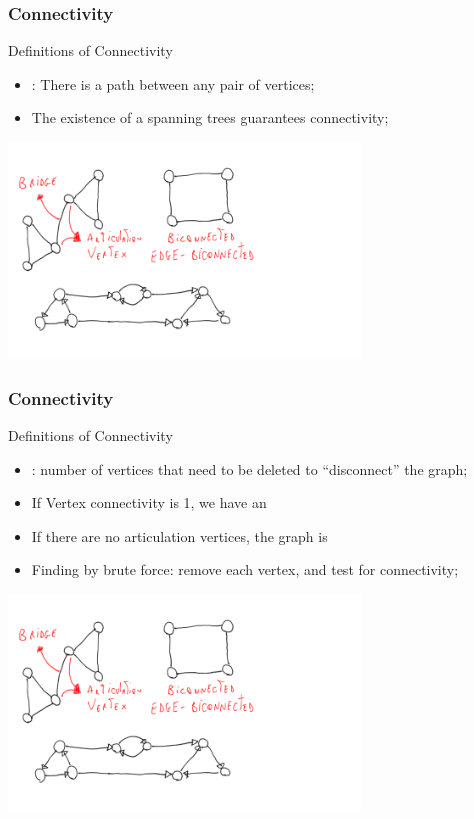\documentclass{beamer}
\begin{document}
\begin{frame}
  \frametitle{Connectivity}
  \begin{block}{Definitions of Connectivity}
    {\smaller
    \begin{itemize}
    \item {}: There is a path between any pair of vertices;
    \item The existence of a spanning trees guarantees connectivity;
    \end{itemize}
    }
  \end{block}
  
  \begin{center}
    \includegraphics[width=0.7\textwidth]{img/biconnected}
  \end{center}
\end{frame}

\begin{frame}
  \frametitle{Connectivity}
  \begin{block}{Definitions of Connectivity}
    {\smaller
      \begin{itemize}
      \item {}: number of vertices that
        need to be deleted to ``disconnect'' the graph;
      \item If Vertex connectivity is 1, we have an
      \item If there are no articulation vertices, the graph is
      \item Finding by brute force: remove each vertex, and test for
        connectivity;
    \end{itemize}}
  \end{block}
  
  \begin{center}
    \includegraphics[width=0.7\textwidth]{img/biconnected}
  \end{center}
\end{frame}
\end{document}
